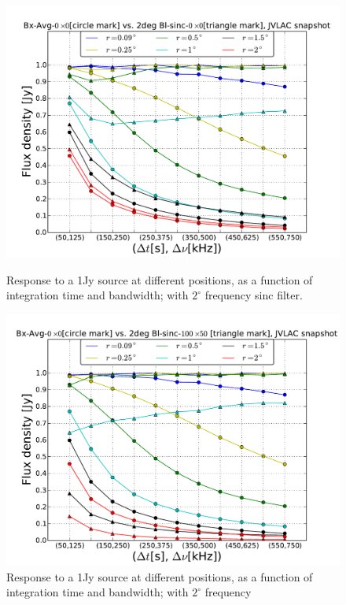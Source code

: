 \documentclass[useAMS,usenatbib]{mn2e}
\begin{document}
\begin{figure}
  \centering
\begin{minipage}{0.38\linewidth}\includegraphics[width=1\textwidth]{./Figures/max-integ-timefreq-sinc-w1x1-fov2.pdf}
    \caption{Response to a 1Jy source at different positions, as a function of integration time and bandwidth; with $2^{\circ}$ frequency 
sinc filter.}
    \label{fig:max-integ-timefreq-sinc-w1x1-fov2}\end{minipage}
 \hspace{1cm}
\begin{minipage}{0.38\linewidth}\includegraphics[width=1\textwidth]{./Figures/max-integ-timefreq-sinc-w100x50-fov2.pdf}
    \caption{Response to a 1Jy source at different positions, as a function of integration time and bandwidth; with $2^{\circ}$ frequency 
}
\end{minipage}
\end{figure}
\end{document}
